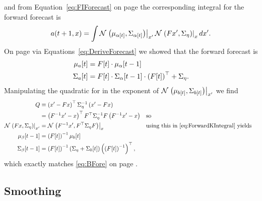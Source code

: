 \begin{enumerate}
\begin{equation}
    \end{equation}
    and from Equation~\eqref{eq:FIForecast} on page
    \pageref{eq:FIForecast} the corresponding integral for the forward
    forecast is
    \begin{equation}
      \label{eq:ForwardKIntegral}
      a(t+1,x) = \int
      {\mathcal{N}}\left.\left(\mu_{{\alpha}{[t]}},\Sigma_{{\alpha}{[t]}}\right)\right|_{x'}
      {\mathcal{N}}\left.\left(Fx',\Sigma_\eta\right)\right|_{x} dx'.
    \end{equation}
    On page \pageref{eq:DeriveForecast} via
    Equations~\eqref{eq:DeriveForecast} we showed that the forward
    forecast is
    \begin{align*}
      {\mu_a}{[t]} &= {F}{[t]} \cdot {\mu_\alpha}{[t-1]}\\
      {\Sigma_a}{[t]} &= {F}{[t]} \cdot {\Sigma_\alpha}{[t-1]}
      \cdot \left({F}{[t]}\right)^\top + \Sigma_\eta.
    \end{align*}
    Manipulating the quadratic for in the exponent of
    ${\mathcal{N}}\left.\left(\mu_{{b}{[t]}},\Sigma_{{b}{[t]}}\right)\right|_{x'}$ we find
    \begin{align*}
      Q
      &\equiv \left(x'-Fx\right)^\top \Sigma^{-1}_\eta
        \left(x'-Fx\right) \\
      &= \left(F^{-1}x'- x\right)^\top F^\top
        \Sigma^{-1}_\eta F \left(F^{-1}x'-x\right)  && \text{so} \\
      {\mathcal{N}}\left.\left(Fx,\Sigma_\eta\right)\right|_{x'}
      &= {\mathcal{N}}\left.\left(F^{-1}x',F^\top\Sigma_\eta F\right)\right|_{x}  &&
                                                             \text{using
                                                             this in
                                                             \eqref{eq:ForwardKIntegral}
                                                             yields}
      \\
      {\mu_\beta}{[t-1]} &= \left( {F}{[t]} \right)^{-1}
      {\mu_b}{[t]} \\
      {\Sigma_\beta}{[t-1]} &= \left( {F}{[t]} \right)^{-1} \left(
        \Sigma_\eta + {\Sigma_b}{[t]} \right) \left( \left( {F}{[t]}
        \right)^{-1} \right)^\top,
    \end{align*}
    which exactly matches \eqref{eq:BFore} on page \pageref{eq:BFore}.
\end{enumerate}

\subsection{Smoothing}
\label{sec:DetailSmoothing}

